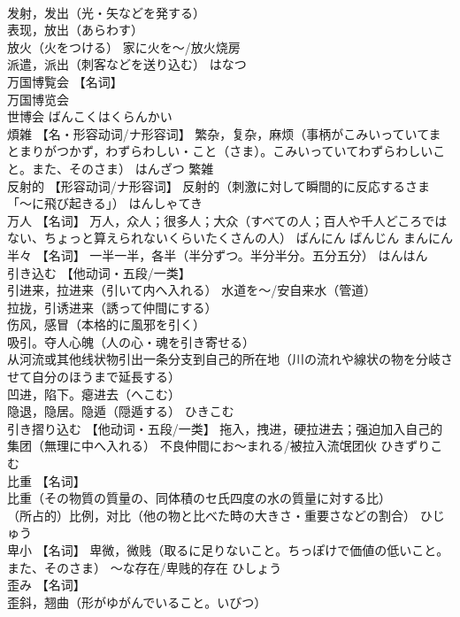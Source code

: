 \documentclass[8pt]{extreport}
\begin{document}
\begin{CJK}{UTF8}{min}
\\	发射，发出（光・矢などを発する） 
\\	表现，放出（あらわす） 
\\	放火（火をつける） 家に火を～/放火烧房 
\\	派遣，派出（刺客などを送り込む）	はなつ	
\\	万国博覧会	【名词】 
\\	万国博览会 
\\	世博会	ばんこくはくらんかい	
\\	煩雑	【名・形容动词/ナ形容词】 繁杂，复杂，麻烦（事柄がこみいっていてまとまりがつかず，わずらわしい・こと（さま）。こみいっていてわずらわしいこと。また、そのさま）	はんざつ	繁雑
\\	反射的	【形容动词/ナ形容词】 反射的（刺激に対して瞬間的に反応するさま「～に飛び起きる」）	はんしゃてき	
\\	万人	【名词】 万人，众人；很多人；大众（すべての人；百人や千人どころではない、ちょっと算えられないくらいたくさんの人）	ばんにん ばんじん まんにん	
\\	半々	【名词】 一半一半，各半（半分ずつ。半分半分。五分五分）	はんはん	
\\	引き込む	【他动词・五段/一类】 
\\	引进来，拉进来（引いて内へ入れる） 水道を～/安自来水（管道） 
\\	拉拢，引诱进来（誘って仲間にする） 
\\	伤风，感冒（本格的に風邪を引く） 
\\	吸引。夺人心魄（人の心・魂を引き寄せる） 
\\	从河流或其他线状物引出一条分支到自己的所在地（川の流れや線状の物を分岐させて自分のほうまで延長する） 
\\	凹进，陷下。瘪进去（へこむ） 
\\	隐退，隐居。隐遁（隠遁する）	ひきこむ	
\\	引き摺り込む	【他动词・五段/一类】 拖入，拽进，硬拉进去；强迫加入自己的集团（無理に中へ入れる） 不良仲間にお～まれる/被拉入流氓团伙	ひきずりこむ	
\\	比重	【名词】 
\\	比重（その物質の質量の、同体積のセ氏四度の水の質量に対する比） 
\\	（所占的）比例，对比（他の物と比べた時の大きさ・重要さなどの割合）	ひじゅう	
\\	卑小	【名词】 卑微，微贱（取るに足りないこと。ちっぽけで価値の低いこと。また、そのさま） ～な存在/卑贱的存在	ひしょう	
\\	歪み	【名词】 
\\	歪斜，翘曲（形がゆがんでいること。いびつ） 

\end{CJK}
\end{document}
